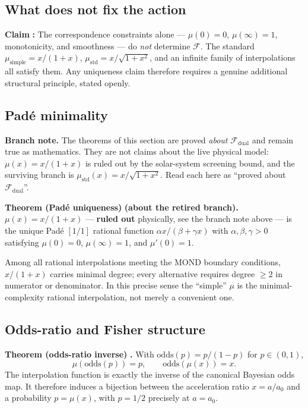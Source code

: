 \documentclass[aps,prd,preprint,superscriptaddress,nofootinbib,amsmath,amssymb,floatfix]{revtex4-2}
\makeatletter
\DeclareRobustCommand{\_}{%
    \ifmmode\nfss@text{\textunderscore}\else\textunderscore\penalty\z@\fi}%
\makeatother
\begin{document}
\subsection{What does not fix the action}

\textbf{Claim} \textbf{:} The correspondence constraints alone --- $\mu(0)=0$, $\mu(\infty)=1$, monotonicity, and smoothness --- do \emph{not} determine $\mathcal{F}$. The standard $\mu_{\text{simple}} = x/(1+x)$, $\mu_{\text{std}} = x/\sqrt{1+x^2}$, and an infinite family of interpolations all satisfy them. Any uniqueness claim therefore requires a genuine additional structural principle, stated openly.

\subsection{Pad\'e minimality}

\medskip\noindent\textbf{Branch note.} The theorems of this section are proved
\emph{about} $\mathcal{F}_{\text{dual}}$ and remain true as mathematics. They are
not claims about the live physical model: $\mu(x) = x/(1+x)$ is ruled out by the
solar-system screening bound, and the surviving branch is
$\mu_{\text{std}}(x) = x/\sqrt{1+x^2}$. Read each  here as
``proved about $\mathcal{F}_{\text{dual}}$''.\medskip

\textbf{Theorem (Pad\'e uniqueness)}  \textbf{(about the retired branch).} $\mu(x) = x/(1+x)$ — \textbf{ruled out} physically, see the branch note above — is the unique Pad\'e $[1/1]$ rational function $\alpha x/(\beta + \gamma x)$ with $\alpha,\beta,\gamma>0$ satisfying $\mu(0)=0$, $\mu(\infty)=1$, and $\mu'(0)=1$.

Among all rational interpolations meeting the MOND boundary conditions, $x/(1+x)$ carries minimal degree; every alternative requires degree $\ge 2$ in numerator or denominator. In this precise sense the ``simple'' $\mu$ is the minimal-complexity rational interpolation, not merely a convenient one.

\subsection{Odds-ratio and Fisher structure}

\textbf{Theorem (odds-ratio inverse)} \textbf{.} With $\text{odds}(p) = p/(1-p)$ for $p\in(0,1)$,
\begin{equation}
\mu(\text{odds}(p)) = p, \qquad \text{odds}(\mu(x)) = x .
\end{equation}
The interpolation function is exactly the inverse of the canonical Bayesian odds map. It therefore induces a bijection between the acceleration ratio $x = a/a_0$ and a probability $p = \mu(x)$, with $p = 1/2$ precisely at $a = a_0$.
\end{document}

